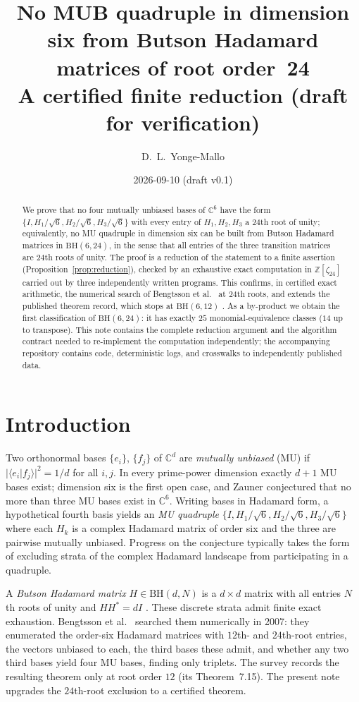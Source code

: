 \documentclass[11pt]{article}
\title{No MUB quadruple in dimension six from Butson Hadamard
matrices of root order~24\\[1ex]
\large A certified finite reduction (draft for verification)}
\author{D.~L.~Yonge-Mallo}
\date{2026-09-10 (draft v0.1)}
\theoremstyle{remark}
\newcommand{\ZZ}{\mathbb{Z}}
\newcommand{\CC}{\mathbb{C}}
\newcommand{\ip}[2]{\langle #1 | #2 \rangle}
\begin{document}
\maketitle

\begin{abstract}
We prove that no four mutually unbiased bases of $\CC^6$ have the form
$\{I, H_1/\sqrt6, H_2/\sqrt6, H_3/\sqrt6\}$ with every entry of $H_1,
H_2, H_3$ a $24$th root of unity; equivalently, no MU quadruple in
dimension six can be built from Butson Hadamard matrices in
$\mathrm{BH}(6,24)$, in the sense that all entries of the three
transition matrices are $24$th roots of unity. The proof is a
reduction of the statement to a finite assertion
(Proposition~\ref{prop:reduction}), checked by an
exhaustive exact computation in $\ZZ[\zeta_{24}]$ carried out by three
independently written programs. This confirms, in certified exact
arithmetic, the numerical search of Bengtsson et
al.~\cite{bengtsson2007} at $24$th roots, and extends the published
theorem record, which stops at $\mathrm{BH}(6,12)$
\cite[Thm.~7.15]{mcnulty2026}. As a by-product we obtain the first
classification of $\mathrm{BH}(6,24)$: it has exactly $25$
monomial-equivalence classes ($14$ up to transpose). This note contains
the complete reduction argument and the algorithm contract needed to
re-implement the computation independently; the accompanying repository
contains code, deterministic logs, and crosswalks to independently
published data.
\end{abstract}

\section{Introduction}

Two orthonormal bases $\{e_i\}$, $\{f_j\}$ of $\CC^d$ are
\emph{mutually unbiased} (MU) if $|\ip{e_i}{f_j}|^2 = 1/d$ for all
$i,j$. In every prime-power dimension exactly $d+1$ MU bases exist;
dimension six is the first open case, and Zauner
\cite{zauner1999} conjectured that no more than three MU bases exist in
$\CC^6$. Writing bases in Hadamard form, a hypothetical fourth basis
yields an \emph{MU quadruple} $\{I, H_1/\sqrt6, H_2/\sqrt6,
H_3/\sqrt6\}$ where each $H_k$ is a complex Hadamard matrix of order
six and the three are pairwise mutually unbiased. Progress on the
conjecture typically takes the form of excluding strata of the complex
Hadamard landscape from participating in a quadruple.

A \emph{Butson Hadamard matrix} $H \in \mathrm{BH}(d, N)$ is a $d
\times d$ matrix with all entries $N$th roots of unity and $H H^* = d
I$ \cite{butson1962}. These discrete strata admit finite exact
exhaustion. Bengtsson et al.~\cite{bengtsson2007} searched them
numerically in 2007: they enumerated the order-six Hadamard matrices
with $12$th- and $24$th-root entries, the vectors unbiased to each, the
third bases these admit, and whether any two third bases yield four MU
bases, finding only triplets. The survey \cite{mcnulty2026} records the
resulting theorem only at root order $12$ (its Theorem~7.15). The
present note upgrades the $24$th-root exclusion to a certified theorem.
\end{document}
